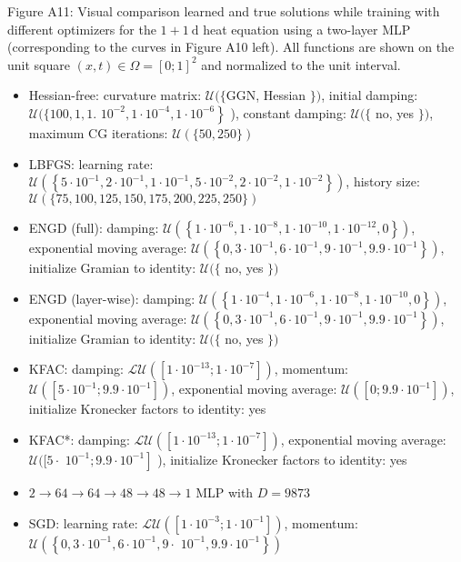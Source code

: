 \documentclass[10pt]{article}
\begin{document}
Figure A11: Visual comparison learned and true solutions while training with different optimizers for the $1+1 \mathrm{~d}$ heat equation using a two-layer MLP (corresponding to the curves in Figure A10 left). All functions are shown on the unit square $(x, t) \in \Omega=[0 ; 1]^{2}$ and normalized to the unit interval.

\begin{itemize}
  \item Hessian-free: curvature matrix: $\mathcal{U}(\{\mathrm{GGN}$, Hessian $\})$, initial damping: $\mathcal{U}(\{100,1,1$. $\left.10^{-2}, 1 \cdot 10^{-4}, 1 \cdot 10^{-6}\right\}$ ), constant damping: $\mathcal{U}(\{$ no, yes $\})$, maximum CG iterations: $\mathcal{U}(\{50,250\})$
  \item LBFGS: learning rate: $\mathcal{U}\left(\left\{5 \cdot 10^{-1}, 2 \cdot 10^{-1}, 1 \cdot 10^{-1}, 5 \cdot 10^{-2}, 2 \cdot 10^{-2}, 1 \cdot 10^{-2}\right\}\right)$, history size: $\mathcal{U}(\{75,100,125,150,175,200,225,250\})$
  \item ENGD (full): damping: $\mathcal{U}\left(\left\{1 \cdot 10^{-6}, 1 \cdot 10^{-8}, 1 \cdot 10^{-10}, 1 \cdot 10^{-12}, 0\right\}\right)$, exponential moving average: $\mathcal{U}\left(\left\{0,3 \cdot 10^{-1}, 6 \cdot 10^{-1}, 9 \cdot 10^{-1}, 9.9 \cdot 10^{-1}\right\}\right)$, initialize Gramian to identity: $\mathcal{U}(\{$ no, yes $\})$
  \item ENGD (layer-wise): damping: $\mathcal{U}\left(\left\{1 \cdot 10^{-4}, 1 \cdot 10^{-6}, 1 \cdot 10^{-8}, 1 \cdot 10^{-10}, 0\right\}\right)$, exponential moving average: $\mathcal{U}\left(\left\{0,3 \cdot 10^{-1}, 6 \cdot 10^{-1}, 9 \cdot 10^{-1}, 9.9 \cdot 10^{-1}\right\}\right)$, initialize Gramian to identity: $\mathcal{U}(\{$ no, yes $\})$
  \item KFAC: damping: $\mathcal{L U}\left(\left[1 \cdot 10^{-13} ; 1 \cdot 10^{-7}\right]\right)$, momentum: $\mathcal{U}\left(\left[5 \cdot 10^{-1} ; 9.9 \cdot 10^{-1}\right]\right)$, exponential moving average: $\mathcal{U}\left(\left[0 ; 9.9 \cdot 10^{-1}\right]\right)$, initialize Kronecker factors to identity: yes
  \item KFAC*: damping: $\mathcal{L U}\left(\left[1 \cdot 10^{-13} ; 1 \cdot 10^{-7}\right]\right)$, exponential moving average: $\mathcal{U}([5 \cdot$ $\left.10^{-1} ; 9.9 \cdot 10^{-1}\right]$ ), initialize Kronecker factors to identity: yes
  \item $2 \rightarrow 64 \rightarrow 64 \rightarrow 48 \rightarrow 48 \rightarrow 1$ MLP with $D=9873$
  \item SGD: learning rate: $\mathcal{L U}\left(\left[1 \cdot 10^{-3} ; 1 \cdot 10^{-1}\right]\right)$, momentum: $\mathcal{U}\left(\left\{0,3 \cdot 10^{-1}, 6 \cdot 10^{-1}, 9 \cdot\right.\right.$ $\left.\left.10^{-1}, 9.9 \cdot 10^{-1}\right\}\right)$

\end{itemize}
\end{document}
